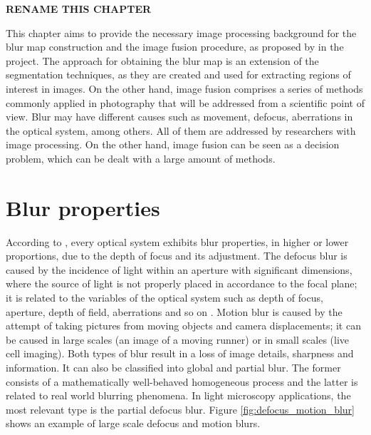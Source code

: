 

\textbf{RENAME THIS CHAPTER}

This chapter aims to provide the necessary image processing background for the blur map construction and the image fusion procedure, as proposed by in the project. The approach for obtaining the blur map is an extension of the segmentation techniques, as they are created and used for extracting regions of interest in images. On the other hand, image fusion comprises a series of methods commonly applied in photography that will be addressed from a scientific point of view. Blur may have different causes such as movement, defocus, aberrations in the optical system, among others. All of them are addressed by researchers with image processing. On the other hand, image fusion can be seen as a decision problem, which can be dealt with a large amount of methods.

\section{Blur properties}

According to , every optical system exhibits blur properties, in higher or lower proportions, due to the depth of focus and its adjustment. The defocus blur is caused by the incidence of light within an aperture with significant dimensions, where the source of light is not properly placed in accordance to the focal plane; it is related to the variables of the optical system such as depth of focus, aperture, depth of field, aberrations and so on \cite{joshi2014defocus}. Motion blur is caused by the attempt of taking pictures from moving objects and camera displacements; it can be caused in large scales (an image of a moving runner) or in small scales (live cell imaging). Both types of blur result in a loss of image details, sharpness and information. It can also be classified into global and partial blur. The former consists of a mathematically well-behaved homogeneous process and the latter is related to real world blurring phenomena. In light microscopy applications, the most relevant type is the partial defocus blur. Figure \ref{fig:defocus_motion_blur} shows an example of large scale defocus and motion blurs.

